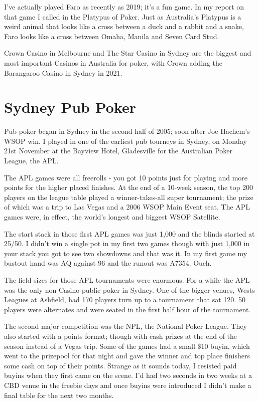 I've actually played Faro as recently as 2019; it's a
fun game. In my report on that game I called in the Platypus of
Poker. Just as Australia's Platypus is a weird animal that looks like
a cross between a duck and a rabbit and a snake, Faro looks like a
cross between Omaha, Manila and Seven Card Stud.

Crown Casino in Melbourne and The Star Casino in Sydney are the
biggest and most important Casinos in Australia for poker, with Crown
adding the Barangaroo Casino in Sydney in 2021.

\section{Sydney Pub Poker}

Pub poker began in Sydney in the second half of 2005; soon after Joe
Hachem's WSOP win. I played in one of the earliest pub tourneys
in Sydney, on Monday 21st November at the Bayview Hotel, Gladesville
for the Australian Poker League, the APL.

The APL games were all freerolls - you got 10 points just for
playing and more points for the higher placed finishes. At the
end of a 10-week season, the top 200 players on the league table
played a winner-takes-all super tournament; the prize of which was a
trip to Las Vegas and a 2006 WSOP Main Event seat. The APL games were,
in effect, the world's longest and biggest WSOP Satellite.

The start stack in those first APL games was just 1,000 and the blinds
started at 25/50. I didn't win a single pot in my first two
games though with just 1,000 in your stack you got to see two
showdowns and that was it. In my first game my bustout hand was
AQ against 96 and the runout was A7354. Ouch.

The field sizes for those APL tournaments were enormous. For a while
the APL was the only non-Casino public poker in Sydney. One of the bigger
venues, Wests Leagues at Ashfield, had 170 players turn up to a
tournament that sat 120. 50 players were alternates and were seated in
the first half hour of the tournament.

The second major competition was the NPL, the National Poker
League. They also started with a points format; though with
cash prizes at the end of the season instead of a Vegas trip. Some of
the games had a small \$10 buyin, which went to the prizepool for that
night and gave the winner and top place finishers some cash on top of
their points. Strange as it sounds today, I resisted
paid buyins when they first came on the scene. I'd had two seconds in
two weeks at a CBD venue in the freebie days and once buyins were
introduced I didn't make a final table for the next two months.

